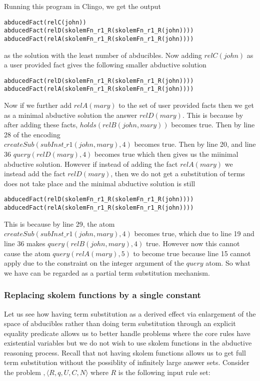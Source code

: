 Running this program in Clingo, we get the output 
\begin{verbatim}
abducedFact(relC(john))
abducedFact(relD(skolemFn_r1_R(skolemFn_r1_R(john))))
abducedFact(relA(skolemFn_r1_R(skolemFn_r1_R(john))))    
\end{verbatim}
as the solution with the least number of abducibles.
Now adding $relC(john)$ as a user provided fact gives the following smaller abductive solution
\begin{verbatim}
abducedFact(relD(skolemFn_r1_R(skolemFn_r1_R(john))))
abducedFact(relA(skolemFn_r1_R(skolemFn_r1_R(john))))    
\end{verbatim}
Now if we further add $relA(mary)$ to the set of user provided facts then we
get as a minimal abductive solution the answer $relD(mary)$. This is because
by after adding these facts, $holds(relB(john,mary))$ becomes true. Then by
line 28 of the encoding\\
$createSub(subInst\_r1(john,mary),4)$ becomes
true. Then by line 20, and line 36 $query(relD(mary),4)$ becomes true which
then gives us the miinimal abductive solution. However if instead of adding
the fact $relA(mary)$ we instead add the fact $relD(mary)$, then we do not get
a  substitution of terms does not take place and the minimal abductive
solution is still
\begin{verbatim}
abducedFact(relD(skolemFn_r1_R(skolemFn_r1_R(john))))
abducedFact(relA(skolemFn_r1_R(skolemFn_r1_R(john))))    
\end{verbatim} 
This is because by line 29, the atom\\ $createSub(subInst\_r1(john,mary),4)$ becomes true,
which due to line 19 and line 36 makes $query(relB(john,mary),4)$
true. However now this cannot cause the atom $query(relA(mary),5)$ to become
true because line 15 cannot apply due to the constraint on the integer
argument of the $query$ atom. So what we have can be regarded as a partial
term substitution mechanism.


\subsubsection{Replacing skolem functions by a single constant}

Let us see how having term substitution as a derived effect via enlargement of
the space of abducibles rather than doing term substitution through an
explicit equality predicate allows us to better handle problems where the core
rules have existential variables but we do not wish to use skolem functions in
the abductive reasoning process. Recall that not having skolem functions
allows us to get full term substitution without the possiblity of infinitely
large answer sets. Consider the problem $,\langle R,q,U,C,N \rangle$ where $R$ is the
following input rule set: 

